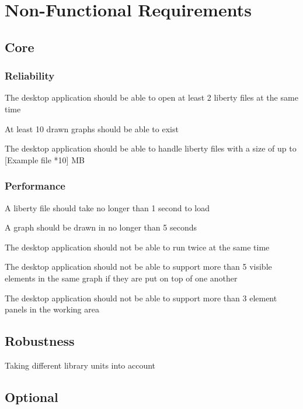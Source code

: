 \documentclass[10pt,a4paper]{report}
\begin{document}
\section{Non-Functional Requirements}
\subsection{Core}
\subsubsection{Reliability}
\begin{NFR-Rel}
    \item The desktop application should be able to open at least 2 liberty files at the same time
    \item At least 10 drawn graphs should be able to exist
    \item The desktop application should be able to handle liberty files with a size of up to [Example file *10] MB
\end{NFR-Rel}

\subsubsection{Performance}
\begin{NFR-Perf}
    \item A liberty file should take no longer than 1 second to load
    \item A graph should be drawn in no longer than 5 seconds
    \item The desktop application should not be able to run twice at the same time
    \item The desktop application should not be able to support more than 5 visible elements in the same graph if they are put on top of one another
    \item  The desktop application should not be able to support more than 3 element panels in the working area
\end{NFR-Perf}

\subsection{Robustness}
\begin{NFR-Rob}
    \item Taking different library units into account
\end{NFR-Rob}

\subsection{Optional}
\end{document}
